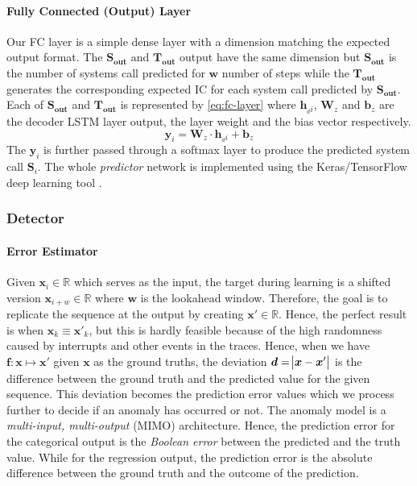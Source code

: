 \paragraph{Fully Connected (Output) Layer}
\label{subsec:decoder}
Our FC layer is a simple dense layer with a dimension matching the expected 
output format. The $ \bm{S_{out}} $ and $ \bm{T_{out}} $ output have the same  
dimension but $ \bm{S_{out}} $ is the number of systems call predicted for $ 
\bm{w} $ number of steps while the $ \bm{T_{out}} $ generates the corresponding 
expected IC for each system call predicted by $ \bm{S_{out}} $. Each of $ 
\bm{S_{out}} $ and $ \bm{T_{out}} $ is represented by \eqref{eq:fc-layer} where 
$ \bm{h}_{_di} $, $ \bm{W}_z $ and $ \bm{b}_z $ are 
the decoder LSTM layer output, the layer weight and the bias vector 
respectively. 
\begin{equation}
\label{eq:fc-layer}
\bm{y}_i = \bm{W}_{z} \cdot \bm{h}_{_di} + \bm{b}_z
\end{equation}
The $ \bm{y}_i $ is further passed through a softmax layer to produce the 
predicted system call $ \mathbf{S}_i $. The whole \emph{predictor} network is 
implemented using the Keras/TensorFlow deep learning tool 
\cite{chollet2015keras}.

\subsubsection{Detector}
\paragraph{Error Estimator}
\label{subsec:error-model}
Given $ \bm{x}_i \in \bm{\mathbb{R}} $ which serves as the input, the target 
during learning is a shifted version $ \bm{x}_{i+w} \in \bm{\mathbb{R}} $ where 
$ \bm{w} $ is the lookahead window. Therefore, the goal is to replicate the 
sequence at the output by creating $ \bm{x}' \in \bm{\mathbb{R}}$. Hence, the 
perfect result is when $\bm{x}_k  \equiv \bm{x}'_k $, but this is hardly 
feasible because of the high randomness caused by interrupts and other events 
in the traces. Hence, when we have $ \bm{f}:\bm{x}\longmapsto \bm{x}' $ given $ 
\bm{x} $ as the ground truths, the deviation $ \bm{d} = \abs{\bm{x} - \bm{x}'} 
$ is the difference between the ground truth and the predicted value for the 
given sequence. This deviation becomes the prediction error values which we 
process further to decide if an anomaly has occurred or not. The anomaly model 
is a \emph{multi-input, multi-output} (MIMO) architecture. Hence, the 
prediction error for the categorical output is the \emph{Boolean error} between 
the predicted and the truth value. While for the regression output, the 
prediction error is the absolute difference between the ground truth and the 
outcome of the prediction.

